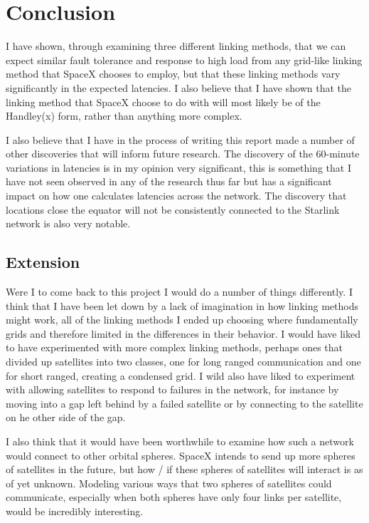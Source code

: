 \documentclass[12pt,a4paper,twoside,openright]{report}
\begin{document}
\chapter{Conclusion}

I have shown, through examining three different linking methods, that we can expect similar fault tolerance and response to high load from any grid-like linking method that SpaceX chooses to employ, but that these linking methods vary significantly in the expected latencies. I also believe that I have shown that the linking method that SpaceX choose to do with will most likely be of the Handley(x) form, rather than anything more complex.

I also believe that I have in the process of writing this report made a number of other discoveries that will inform future research. The discovery of the 60-minute variations in latencies is in my opinion very significant, this is something that I have not seen observed in any of the research thus far but has a significant impact on how one calculates latencies across the network. The discovery that locations close the equator will not be consistently connected to the Starlink network is also very notable.

\section{Extension}

Were I to come back to this project I would do a number of things differently. I think that I have been let down by a lack of imagination in how linking methods might work, all of the linking methods I ended up choosing where fundamentally grids and therefore limited in the differences in their behavior. I would have liked to have experimented with more complex linking methods, perhaps ones that divided up satellites into two classes, one for long ranged communication and one for short ranged, creating a condensed grid. I wild also have liked to experiment with allowing satellites to respond to failures in the network, for instance by moving into a gap left behind by a failed satellite or by connecting to the satellite on he other side of the gap.

I also think that it would have been worthwhile to examine how such a network would connect to other orbital spheres. SpaceX intends to send up more spheres of satellites in the future, but how / if these spheres of satellites will interact is as of yet unknown. Modeling various ways that two spheres of satellites could communicate, especially when both spheres have only four links per satellite, would be incredibly interesting.
\end{document}
